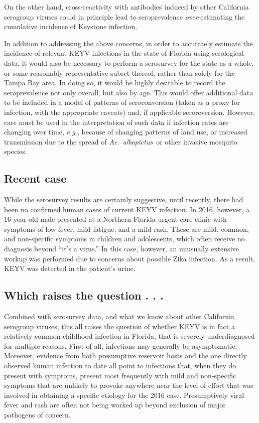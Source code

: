 \documentclass[12pt]{article}
\newcommand{\alb}{\textit{Ae.\ albopictus}}
\newcommand{\eg}{\textit{e.g.}}
\newcommand{\cjh}{\textcolor{blue}{cjh}}
\newcommand{\msg}[3]{(#1 $\rightarrow$ #2: #3)}
\newcommand{\mcc}[1]{\msg\cjh\cjh{#1}}
\begin{document}
        On the other hand, cross-reactivity with antibodies induced by other California serogroup viruses could in principle lead to seroprevalence \textit{over}-estimating the cumulative incidence of Keystone infection.

        In addition to addressing the above concerns, in order to accurately estimate the incidence of relevant KEYV infections in the state of Florida using serological data, it would also be necessary to perform a serosurvey for the state as a whole, or some reasonably representative subset thereof, rather than solely for the Tampa Bay area. In doing so, it would be highly desirable to record the seroprevalence not only overall, but also by age. This would offer additional data to be included in a model of patterns of seroconversion (taken as a proxy for infection, with the appropriate caveats) and, if applicable seroreversion. However, care must be used in the interpretation of such data if infection rates are changing over time, \eg, because of changing patterns of land use, or increased transmission due to the spread of \alb\ or other invasive mosquito species.


        \subsection{Recent case}
            \label{recent-case}
            While the serosurvey results are certainly suggestive, until recently, there had been no confirmed human cases of current KEYV infection. In 2016, however, a 16-year-old male presented at a Northern Florida urgent care clinic with symptoms of low fever, mild fatigue, and a mild rash. These are mild, common, and non-specific symptoms in children and adolescents, which often receive no diagnosis beyond ``it's a virus.'' In this case, however, an unusually extensive workup was performed due to concerns about possible Zika infection. As a result, KEYV was detected in the patient's urine.\cite{lednicky2018keystone}
        

        \subsection{Which raises the question . . .}
            \label{raises-the-question}
            Combined with serosurvey data, and what we know about other California serogroup viruses, this all raises the question of whether KEYV is in fact a relatively common childhood infection in Florida, that is severely underdiagnosed for multiple reasons. First of all, infections may generally be asymptomatic. Moreover, evidence from both presumptive reservoir hosts and the one directly observed human infection to date all point to infections that, when they do present with symptoms, present most frequently with mild and non-specific symptoms that are unlikely to provoke anywhere near the level of effort that was involved in obtaining a specific etiology for the 2016 case. Presumptively viral fever and rash are often not being worked up beyond exclusion of major pathogens of concern.
        
\end{document}
